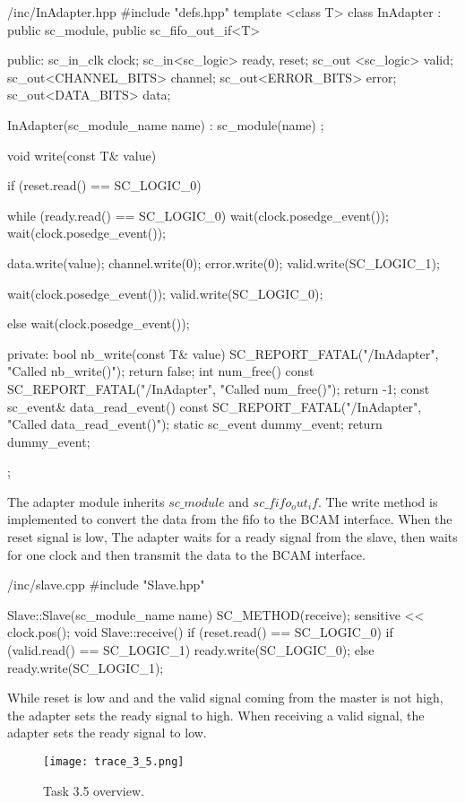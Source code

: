 \documentclass[../main.tex]{subfiles}
\begin{document}
\begin{myminted}{/inc/InAdapter.hpp}
#include "defs.hpp"
template <class T>
class InAdapter : public sc_module, public sc_fifo_out_if<T> {
public:
	sc_in_clk clock;
	sc_in<sc_logic> ready, reset;
	sc_out <sc_logic> valid;
	sc_out<CHANNEL_BITS> channel;
	sc_out<ERROR_BITS> error;
	sc_out<DATA_BITS> data;

	InAdapter(sc_module_name name) : sc_module(name) {};

	void write(const T& value) {
		if (reset.read() == SC_LOGIC_0) {

			while (ready.read() == SC_LOGIC_0) {
				wait(clock.posedge_event());
			}
			wait(clock.posedge_event());

			data.write(value);
			channel.write(0);
			error.write(0);
			valid.write(SC_LOGIC_1);

			wait(clock.posedge_event());
			valid.write(SC_LOGIC_0);
		}
		else {
			wait(clock.posedge_event());
		}
	}
private:
	bool nb_write(const T& value)
	{
		SC_REPORT_FATAL("/InAdapter", "Called nb_write()");
		return false;
	}
	int num_free() const
	{
		SC_REPORT_FATAL("/InAdapter", "Called num_free()");
		return -1;
	}
	const sc_event& data_read_event() const
	{
		SC_REPORT_FATAL("/InAdapter", "Called data_read_event()");
		static sc_event dummy_event;
		return dummy_event;
	}
};
\end{myminted}

The adapter module inherits $sc\_module$ and $sc\_fifo_out_if$. The write method is implemented to convert the data from the fifo to the BCAM interface. 
When the reset signal is low, The adapter waits for a ready signal from the slave, then waits for one clock and then transmit the data to the BCAM interface.

\begin{myminted}{/inc/slave.cpp}
#include "Slave.hpp"

Slave::Slave(sc_module_name name)
{
	SC_METHOD(receive);
	sensitive << clock.pos();
}
void Slave::receive()
{
	if (reset.read() == SC_LOGIC_0) {
		if (valid.read() == SC_LOGIC_1) {
			ready.write(SC_LOGIC_0);
		} else {
			ready.write(SC_LOGIC_1);
		}
	}
}
\end{myminted}
While reset is low and and the valid signal coming from the master is not high, the adapter sets the ready signal to high. When receiving a valid signal, the adapter sets the ready signal to low. 

\begin{figure}[h]
    \centering
    \texttt{[image: trace\_3\_5.png]}
    \caption{Task 3.5 overview.}
\end{figure}
\end{document}
